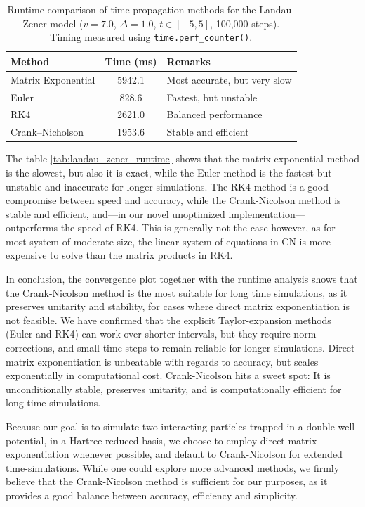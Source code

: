 \documentclass{subfiles}
\begin{document}
\begin{table}[h!]
\centering
\caption{Runtime comparison of time propagation methods for the Landau-Zener model ($v = 7.0$, $\Delta = 1.0$, $t \in [-5, 5]$, 100,000 steps). Timing measured using \texttt{time.perf\_counter()}.}
\begin{tabular}{l c l}
\toprule
\textbf{Method} & \textbf{Time (ms)} & \textbf{Remarks} \\
\midrule
Matrix Exponential & 5942.1 & Most accurate, but very slow \\
Euler              & 828.6  & Fastest, but unstable \\
RK4                & 2621.0 & Balanced performance \\
Crank--Nicholson   & 1953.6 & Stable and efficient \\
\bottomrule
\end{tabular}\label{tab:landau_zener_runtime}
\end{table}
The table \eqref{tab:landau_zener_runtime} shows that the matrix exponential method is the slowest, but also it is exact, while the Euler method is the fastest but unstable and inaccurate for longer simulations. The RK4 method is a good compromise between speed and accuracy, while the Crank-Nicolson method is stable and efficient, and—in our novel unoptimized implementation— outperforms the speed of RK4. This is generally not the case however, as for most system of moderate size, the linear system of equations in CN is more expensive to solve than the matrix products in RK4. 

In conclusion, the convergence plot together with the runtime analysis shows that the Crank-Nicolson method is the most suitable for long time simulations, as it preserves unitarity and stability, for cases where direct matrix exponentiation is not feasible. We have confirmed that the explicit Taylor-expansion methods (Euler and RK4) can work over shorter intervals, but they require norm corrections, and small time steps to remain reliable for longer simulations. Direct matrix exponentiation is unbeatable with regards to accuracy, but scales exponentially in computational cost. Crank-Nicolson hits a sweet spot: It is unconditionally stable, preserves unitarity, and is computationally efficient for long time simulations. 

Because our goal is to simulate two interacting particles trapped in a double-well potential, in a Hartree-reduced basis, we choose to employ direct matrix exponentiation whenever possible, and default to Crank-Nicolson for extended time-simulations. While one could explore more advanced methods, we firmly believe that the Crank-Nicolson method is sufficient for our purposes, as it provides a good balance between accuracy, efficiency and simplicity.
\end{document}
